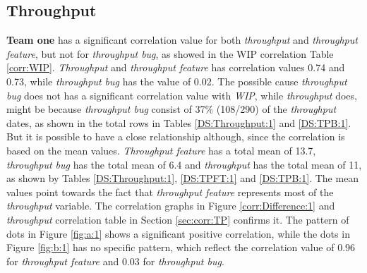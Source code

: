\documentclass[UKenglish]{ifimaster}  %
\begin{document}
\subsection{Throughput}
\textbf{Team one} has a significant correlation value for both \textit{throughput} and \textit{throughput feature}, but not for \textit{throughput bug}, as showed in the WIP correlation Table \ref{corr:WIP}. \textit{Throughput} and \textit{throughput feature} has correlation values 0.74 and 0.73, while \textit{throughput bug} has the value of 0.02. The possible cause \textit{throughput bug} does not has a  significant correlation value with \textit{WIP}, while \textit{throughput} does, might be because \textit{throughput bug} consist of 37\% (108/290) of the \textit{throughput} dates, as shown in the total rows in Tables \ref{DS:Throughput:1} and \ref{DS:TPB:1}. But it is possible to have a close relationship although, since the correlation is based on the mean values. \textit{Throughput feature} has a total mean of 13.7, \textit{throughput bug} has the total mean of 6.4 and \textit{throughput} has the total mean of 11, as shown by Tables  \ref{DS:Throughput:1}, \ref{DS:TPFT:1} and \ref{DS:TPB:1}. The mean values point towards the fact that \textit{throughput feature} represents most of the \textit{throughput} variable. The correlation  graphs in Figure \ref{corr:Difference:1}  and \textit{throughput} correlation table in Section \ref{sec:corr:TP} confirms it. The pattern of dots in Figure \ref{fig:a:1} shows a significant positive correlation, while the dots in Figure \ref{fig:b:1} has no specific pattern, which reflect the correlation value of 0.96 for \textit{throughput feature} and 0.03 for \textit{throughput bug}.
\end{document}
